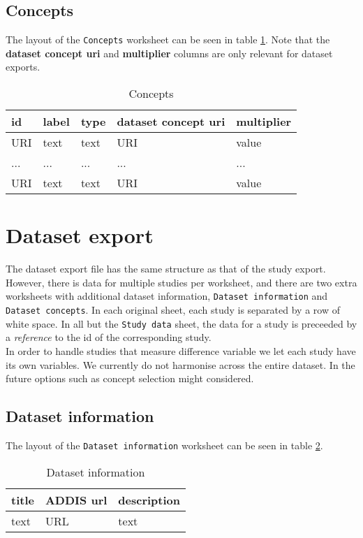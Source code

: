 \documentclass[a4paper,10pt]{article}
\begin{document}
\subsection*{Concepts}
The layout of the \texttt{Concepts} worksheet can be seen in table \ref{table:Concepts}. Note that the \textbf{dataset concept uri} and \textbf{multiplier} columns are only relevant for dataset exports.
\begin{table}[!h]
  \centering
  \caption{Concepts}
  \label{table:Concepts}
  \begin{tabular}{|l|l|l|l|l|}
    \hline
    \textbf{id} & \textbf{label} & \textbf{type} & \textbf{dataset concept uri} & \textbf{multiplier} \\ \hline
    URI         & text           & text          & URI                          & value               \\ \hline
    ...         & ...            & ...           & ...                          & ...                 \\ \hline
    URI         & text           & text          & URI                          & value               \\ \hline
  \end{tabular}
\end{table}

\section*{Dataset export}
The dataset export file has the same structure as that of the study export. However, there is data for multiple studies per worksheet, and there are two extra worksheets with additional dataset information, \texttt{Dataset information} and \texttt{Dataset concepts}. In each original sheet, each study is separated by a row of white space. In all but the \texttt{Study data} sheet, the data for a study is preceeded by a \textit{reference} to the id of the corresponding study.\\
In order to handle studies that measure difference variable we let each study have its own variables. We currently do not harmonise across the entire dataset. In the future options such as concept selection might considered.

\subsection*{Dataset information}
The layout of the \texttt{Dataset information} worksheet can be seen in table \ref{table:Dataset information}.
\begin{table}[!h]
  \centering
  \caption{Dataset information}
  \label{table:Dataset information}
  \begin{tabular}{|l|l|l|}
    \hline
    \textbf{title} & \textbf{ADDIS url} & \textbf{description} \\ \hline
    text           & URL                & text                 \\ \hline
  \end{tabular}
\end{table}
\end{document}
